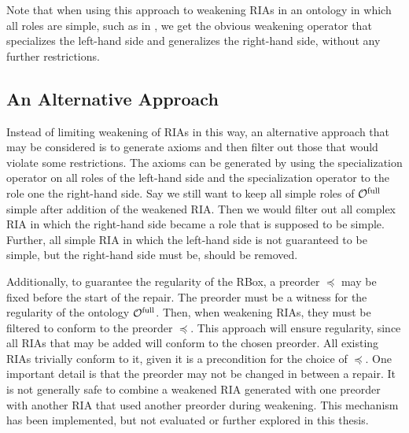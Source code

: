 Note that when using this approach to weakening RIAs in an ontology in which all roles are simple, such as in \ALCH, we get the obvious weakening operator that specializes the left-hand side and generalizes the right-hand side, without any further restrictions.

\subsection{An Alternative Approach}\label{rbox-alternative}

Instead of limiting weakening of RIAs in this way, an alternative approach that may be considered is to generate axioms and then filter out those that would violate some restrictions. The axioms can be generated by using the specialization operator on all roles of the left-hand side and the specialization operator to the role one the right-hand side. Say we still want to keep all simple roles of ${\mathcal{O}^\textnormal{full}}$ simple after addition of the weakened RIA. Then we would filter out all complex RIA in which the right-hand side became a role that is supposed to be simple. Further, all simple RIA in which the left-hand side is not guaranteed to be simple, but the right-hand side must be, should be removed.

Additionally, to guarantee the regularity of the RBox, a preorder $\preceq$ may be fixed before the start of the repair. The preorder must be a witness for the regularity of the ontology ${\mathcal{O}^\textnormal{full}}$. Then, when weakening RIAs, they must be filtered to conform to the preorder $\preceq$. This approach will ensure regularity, since all RIAs that may be added will conform to the chosen preorder. All existing RIAs trivially conform to it, given it is a precondition for the choice of $\preceq$. One important detail is that the preorder may not be changed in between a repair. It is not generally safe to combine a weakened RIA generated with one preorder with another RIA that used another preorder during weakening. This mechanism has been implemented, but not evaluated or further explored in this thesis.
